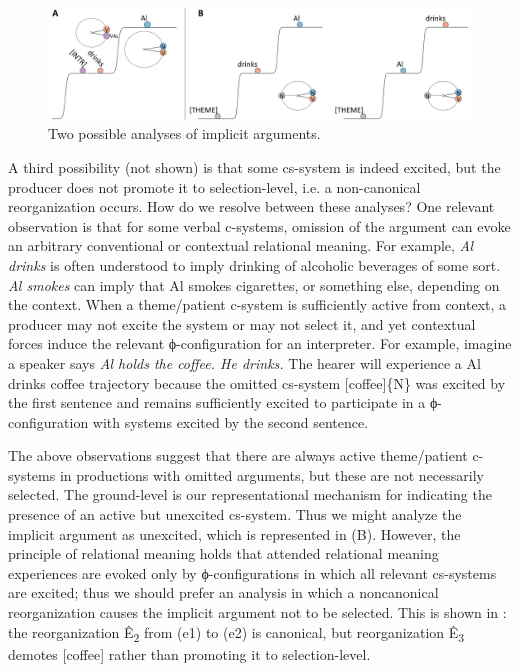   
\begin{figure}
\includegraphics[width=\textwidth]{figures/Tilsen-img86.png}
\caption{Two possible analyses of implicit arguments.}
\label{fig:4:36}
\end{figure}
 

  A third possibility (not shown) is that some cs-system is indeed excited, but the producer does not promote it to selection-level, i.e. a non-canonical reorganization occurs. How do we resolve between these analyses? One relevant observation is that for some verbal c-systems, omission of the argument can evoke an arbitrary conventional or contextual relational meaning. For example, \textit{Al drinks} is often understood to imply drinking of alcoholic beverages of some sort. \textit{Al smokes} can imply that Al smokes cigarettes, or something else, depending on the context. When a theme/patient c-system is sufficiently active from context, a producer may not excite the system or may not select it, and yet contextual forces induce the relevant ϕ-configuration for an interpreter. For example, imagine a speaker says \textit{Al holds the coffee. He drinks.} The hearer will experience a {\textbar}Al drinks coffee{\textbar} trajectory because the omitted cs-system [coffee]\{N\} was excited by the first sentence and remains sufficiently excited to participate in a ϕ-configuration with systems excited by the second sentence.

  The above observations suggest that there are always active theme/patient c-systems in productions with omitted arguments, but these are not necessarily selected. The ground-level is our representational mechanism for indicating the presence of an active but unexcited cs-system. Thus we might analyze the implicit argument as unexcited, which is represented in {}(B). However, the principle of relational meaning holds that attended relational meaning experiences are evoked only by ϕ-configurations in which all relevant cs-systems are excited; thus we should prefer an analysis in which a noncanonical reorganization causes the implicit argument not to be selected. This is shown in {}: the reorganization Ê\textsubscript{2} from (e1) to (e2) is canonical, but reorganization Ê\textsubscript{3} demotes [coffee] rather than promoting it to selection-level.

